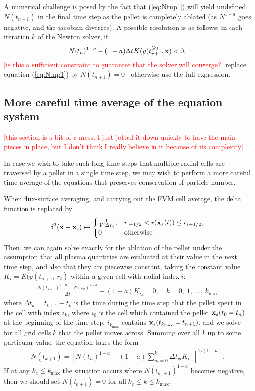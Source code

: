\documentclass[11pt,a4paper]{article}
\newcommand{\sub}[1]{\ensuremath{_{\text{#1}}}}
\renewcommand{\b}[1]{\ensuremath{ {\bf #1 } }}
\begin{document}
A numerical challenge is posed by the fact that (\ref{eq:Ntnp1}) will yield undefined $N(t_{n+1})$ in the final time step as the pellet is completely ablated (as $N^{1-a}$ goes negative, and the jacobian diverges). A possible resolution is as follows: in each iteration $k$ of the Newton solver, if
\begin{align}
N(t_n)^{1-a} - (1-a)\Delta t K(y(t_{n+1}^{(k)},\b{x}) < 0,
\end{align}
\textcolor{red}{[is this a sufficient constraint to guarantee that the solver will converge?]} replace equation (\ref{eq:Ntnp1}) by $N(t_{n+1}) = 0$ , otherwise use the full expression.

\subsection*{More careful time average of the equation system}
\textcolor{red}{[this section is a bit of a mess, I just jotted it down quickly to have the main pieces in place, but I don't think I really believe in it because of its complexity]}

In case we wish to take such long time steps that multiple radial cells are traversed by a pellet in a single time step, we may wish to perform a more careful time average of the equations that preserves conservation of particle number.

When flux-surface averaging, and carrying out the FVM cell average, the delta function is replaced by
\begin{align}
\delta^3(\b{x}-\b{x}_s) \mapsto \begin{cases}
\frac{1}{V' \Delta r_i}, & r_{i-1/2} < r(\b{x}_s(t)) \leq r_{i+1/2}, \\
0 & \text{otherwise}.
\end{cases}
\end{align}
Then, we can again solve exactly for the ablation of the pellet under the assumption that all plasma quantities are evaluated at their value in the next time step, and also that they are piecewise constant, taking the constant value $K_i = K(y(t_{n+1}, \,r_i)$ within a given cell with radial index $i$:
\begin{align}
\frac{N(t_{k+1})^{1-a} - N(t_k)^{1-a}}{\Delta t} + (1-a) K_{i_k} = 0, \quad k = 0,~1,~...,~k\sub{max}
\end{align}
where $\Delta t_k = t_{k+1} - t_k$ is the time during the time step that the pellet spent in the cell with index $i_k$, where $i_0$ is the cell which contained the pellet $\b{x}_s(t_0 = t_n)$ at the beginning of the time step, $i_{k\sub{max}}$ contains $\b{x}_s(t_{k\sub{max}} = t_{n+1})$, and we solve for all grid cells $k$ that the pellet moves across. Summing over all $k$ up to some particular value, the equation takes the form
\begin{align}
N(t_{k+1}) = \left[ N(t_n)^{1-a} - (1-a)\sum_{m=0}^k\Delta t_m K_{i_m} \right]^{1/(1-a)}.
\end{align}
If at any $k_c\leq k\sub{max}$ the situation occurs where $N(t_{k_c+1})^{1-a}$ becomes negative, then we should set $N(t_{k+1})=0$ for all $k_c \leq k \leq k\sub{max}$.
\end{document}

